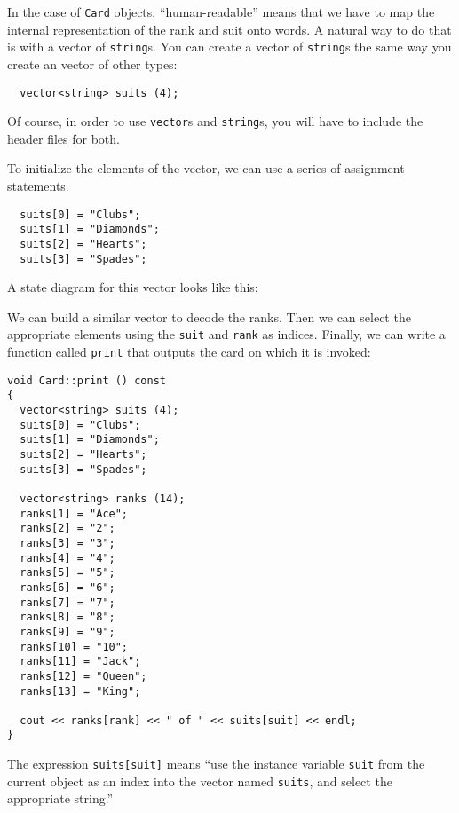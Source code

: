 
In the case of {\tt Card} objects, ``human-readable'' means that we
have to map the internal representation of the rank and suit onto
words.  A natural way to do that is with a vector of {\tt string}s.
You can create a vector of {\tt string}s the same way you create an
vector of other types:

\begin{lstlisting}
  vector<string> suits (4);
\end{lstlisting}
%
Of course, in order to use {\tt vector}s and {\tt string}s, you
will have to include the header files for both.

To initialize the elements of the vector, we can use a series of
assignment statements.

\begin{lstlisting}
  suits[0] = "Clubs";
  suits[1] = "Diamonds";
  suits[2] = "Hearts";
  suits[3] = "Spades";
\end{lstlisting}
%
A state diagram for this vector looks like this:


\vspace{0.1in}
\centerline{}
\vspace{0.1in}

We can build a similar vector to decode the ranks.
Then we can select the appropriate elements
using the {\tt suit} and {\tt rank} as indices.  Finally, we can
write a function called {\tt print} that outputs the card on which
it is invoked:

\begin{lstlisting}
void Card::print () const
{
  vector<string> suits (4);
  suits[0] = "Clubs";
  suits[1] = "Diamonds";
  suits[2] = "Hearts";
  suits[3] = "Spades";

  vector<string> ranks (14);
  ranks[1] = "Ace";
  ranks[2] = "2";
  ranks[3] = "3";
  ranks[4] = "4";
  ranks[5] = "5";
  ranks[6] = "6";
  ranks[7] = "7";
  ranks[8] = "8";
  ranks[9] = "9";
  ranks[10] = "10";
  ranks[11] = "Jack";
  ranks[12] = "Queen";
  ranks[13] = "King";

  cout << ranks[rank] << " of " << suits[suit] << endl;
}
\end{lstlisting}
%
The expression {\tt suits[suit]} means ``use the instance variable
{\tt suit} from the current object as an index into the vector named
{\tt suits}, and select the appropriate string.''

